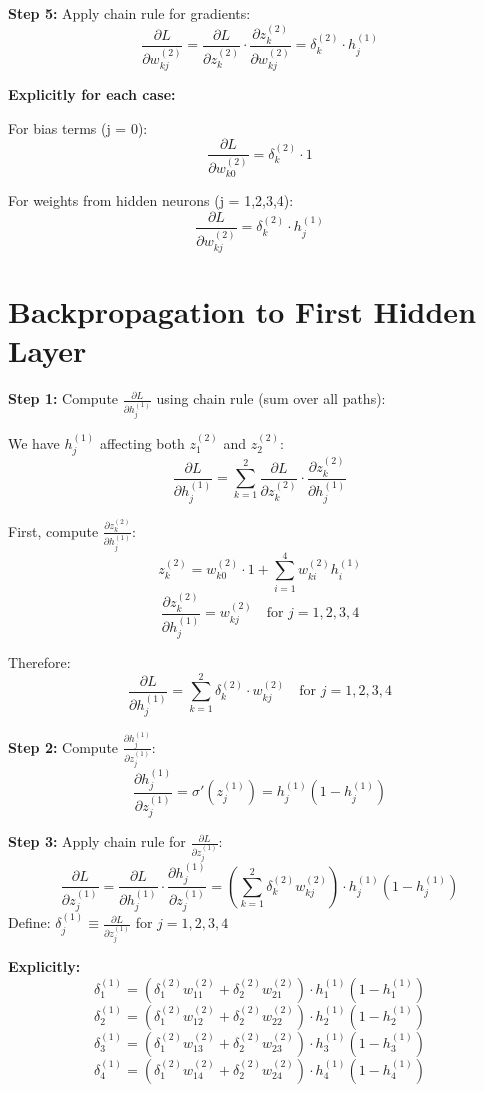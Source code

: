 \documentclass{article}
\begin{document}
\textbf{Step 5:} Apply chain rule for gradients:
\[
\frac{\partial L}{\partial w_{kj}^{(2)}} = \frac{\partial L}{\partial z_k^{(2)}} \cdot \frac{\partial z_k^{(2)}}{\partial w_{kj}^{(2)}} = \delta_k^{(2)} \cdot h_j^{(1)}
\]

\textbf{Explicitly for each case:}

For bias terms (j = 0):
\[
\frac{\partial L}{\partial w_{k0}^{(2)}} = \delta_k^{(2)} \cdot 1
\]

For weights from hidden neurons (j = 1,2,3,4):
\[
\frac{\partial L}{\partial w_{kj}^{(2)}} = \delta_k^{(2)} \cdot h_j^{(1)}
\]

\section{Backpropagation to First Hidden Layer}

\textbf{Step 1:} Compute \( \frac{\partial L}{\partial h_j^{(1)}} \) using chain rule (sum over all paths):

We have \( h_j^{(1)} \) affecting both \( z_1^{(2)} \) and \( z_2^{(2)} \):
\[
\frac{\partial L}{\partial h_j^{(1)}} = \sum_{k=1}^{2} \frac{\partial L}{\partial z_k^{(2)}} \cdot \frac{\partial z_k^{(2)}}{\partial h_j^{(1)}}
\]

First, compute \( \frac{\partial z_k^{(2)}}{\partial h_j^{(1)}} \):
\[
z_k^{(2)} = w_{k0}^{(2)} \cdot 1 + \sum_{i=1}^{4} w_{ki}^{(2)} h_i^{(1)}
\]
\[
\frac{\partial z_k^{(2)}}{\partial h_j^{(1)}} = w_{kj}^{(2)} \quad \text{for } j = 1,2,3,4
\]

Therefore:
\[
\frac{\partial L}{\partial h_j^{(1)}} = \sum_{k=1}^{2} \delta_k^{(2)} \cdot w_{kj}^{(2)} \quad \text{for } j = 1,2,3,4
\]

\textbf{Step 2:} Compute \( \frac{\partial h_j^{(1)}}{\partial z_j^{(1)}} \):
\[
\frac{\partial h_j^{(1)}}{\partial z_j^{(1)}} = \sigma'(z_j^{(1)}) = h_j^{(1)}(1 - h_j^{(1)})
\]

\textbf{Step 3:} Apply chain rule for \( \frac{\partial L}{\partial z_j^{(1)}} \):
\[
\frac{\partial L}{\partial z_j^{(1)}} = \frac{\partial L}{\partial h_j^{(1)}} \cdot \frac{\partial h_j^{(1)}}{\partial z_j^{(1)}} = \left( \sum_{k=1}^{2} \delta_k^{(2)} w_{kj}^{(2)} \right) \cdot h_j^{(1)}(1 - h_j^{(1)})
\]
Define: \( \delta_j^{(1)} \equiv \frac{\partial L}{\partial z_j^{(1)}} \) for \( j = 1,2,3,4 \)

\textbf{Explicitly:}
\[
\delta_1^{(1)} = (\delta_1^{(2)} w_{11}^{(2)} + \delta_2^{(2)} w_{21}^{(2)}) \cdot h_1^{(1)}(1 - h_1^{(1)})
\]
\[
\delta_2^{(1)} = (\delta_1^{(2)} w_{12}^{(2)} + \delta_2^{(2)} w_{22}^{(2)}) \cdot h_2^{(1)}(1 - h_2^{(1)})
\]
\[
\delta_3^{(1)} = (\delta_1^{(2)} w_{13}^{(2)} + \delta_2^{(2)} w_{23}^{(2)}) \cdot h_3^{(1)}(1 - h_3^{(1)})
\]
\[
\delta_4^{(1)} = (\delta_1^{(2)} w_{14}^{(2)} + \delta_2^{(2)} w_{24}^{(2)}) \cdot h_4^{(1)}(1 - h_4^{(1)})
\]
\end{document}

